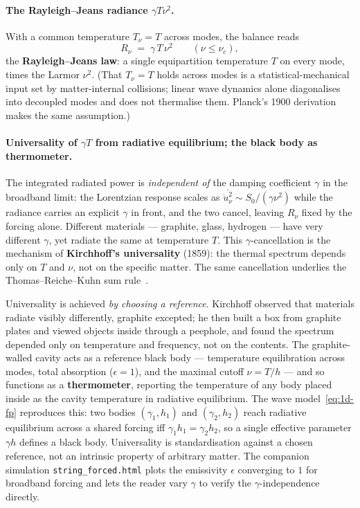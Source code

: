\paragraph{The Rayleigh--Jeans radiance $\gamma T\nu^2$.}
With a common temperature $T_\nu = T$ across modes, the balance reads
\begin{equation}\label{eq:rj}
R_\nu \;=\; \gamma\, T\, \nu^2 \qquad (\nu \le \nu_c),
\end{equation}
the \textbf{Rayleigh--Jeans law}: a single equipartition temperature $T$ on every mode, times the Larmor $\nu^2$. (That $T_\nu = T$ holds across modes is a statistical-mechanical input set by matter-internal collisions; linear wave dynamics alone diagonalises into decoupled modes and does not thermalise them. Planck's 1900 derivation makes the same assumption.)

\paragraph{Universality of $\gamma T$ from radiative equilibrium; the black body as thermometer.}
The integrated radiated power is \emph{independent of} the damping coefficient $\gamma$ in the broadband limit: the Lorentzian response scales as $\overline{\dot u_\nu^2}\sim S_0/(\gamma\nu^2)$ while the radiance carries an explicit $\gamma$ in front, and the two cancel, leaving $R_\nu$ fixed by the forcing alone. Different materials --- graphite, glass, hydrogen --- have very different $\gamma$, yet radiate the same at temperature $T$. This $\gamma$-cancellation is the mechanism of \textbf{Kirchhoff's universality} (1859): the thermal spectrum depends only on $T$ and $\nu$, not on the specific matter. The same cancellation underlies the Thomas--Reiche--Kuhn sum rule~\cite{TRK}.

Universality is achieved \emph{by choosing a reference}. Kirchhoff observed that materials radiate visibly differently, graphite excepted; he then built a box from graphite plates and viewed objects inside through a peephole, and found the spectrum depended only on temperature and frequency, not on the contents. The graphite-walled cavity acts as a reference black body --- temperature equilibration across modes, total absorption ($\epsilon = 1$), and the maximal cutoff $\nu = T/h$ --- and so functions as a \textbf{thermometer}, reporting the temperature of any body placed inside as the cavity temperature in radiative equilibrium. The wave model~\eqref{eq:1d-fp} reproduces this: two bodies $(\gamma_1, h_1)$ and $(\gamma_2, h_2)$ reach radiative equilibrium across a shared forcing iff $\gamma_1 h_1 = \gamma_2 h_2$, so a single effective parameter $\gamma h$ defines a black body. Universality is standardisation against a chosen reference, not an intrinsic property of arbitrary matter. The companion simulation \texttt{string\_forced.html} plots the emissivity $\epsilon$ converging to $1$ for broadband forcing and lets the reader vary $\gamma$ to verify the $\gamma$-independence directly.

